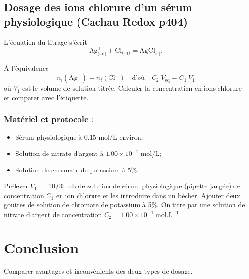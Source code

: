 \documentclass[11pt,a4paper]{report}
\begin{document}
\subsection{Dosage des ions chlorure d'un sérum physiologique (Cachau Redox p404)}

L'équation du titrage s'écrit
\begin{equation}
	\boxed{\text{Ag}^+_\text{(aq)} + \text{Cl}^-_\text{(aq)} = \text{AgCl}_\text{(s)}}.
\end{equation}

\'A l'équivalence
\begin{equation}
	n_i(\text{Ag}^+) = n_i(\text{Cl}^-) \quad\text{d'où}\quad  C_2\;V_\text{eq} = C_1\;V_1
\end{equation} 
où $V_1$ est le volume de solution titrée. Calculer la concentration en ions chlorure et comparer avec l'étiquette.

\subsubsection*{Matériel et protocole :}
\begin{itemize}
	\item Sérum physiologique à 0.15 mol/L environ;
	\item Solution de nitrate d'argent à $1.00\times10^{-1}$ mol/L;
	\item Solution de chromate de potassium à 5\%.\\
\end{itemize}

Prélever $V_1 =$ 10,00 mL de solution de sérum physiologique (pipette jaugée) de concentration $C_1$ en ion chlorure et les introduire dans un bécher. Ajouter deux gouttes de solution de chromate de potassium à 5\%. On titre par une solution de nitrate d'argent de concentration $C_2 = 1.00\times10^{-1}\;\text{mol}.\text{L}^{-1}$.

\section*{Conclusion}

Comparer avantages et inconvénients des deux types de dosage.
\end{document}
